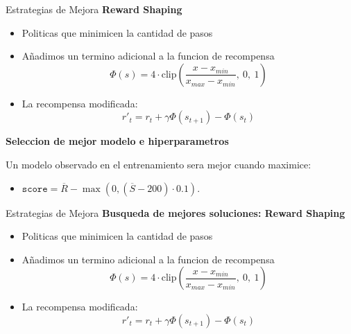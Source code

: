 \begin{frame}{Estrategias de Mejora}
    \textbf{Reward Shaping}
    \begin{itemize}
        \item Politicas que minimicen la cantidad de pasos
        \item Añadimos un termino adicional a la funcion de recompensa
        $$
            \Phi(s) = 4 \cdot \text{clip}\left( \frac{x - x_{min}}{x_{max} - x_{min}}, \ 0, \ 1 \right)
        $$
        \item La recompensa modificada:
        $$
            r'_t = r_t + \gamma\Phi(s_{t+1}) - \Phi(s_t)
        $$
    \end{itemize}
    \textbf{Seleccion de mejor modelo e hiperparametros}
    
    Un modelo observado en el entrenamiento sera mejor cuando maximice:
    \begin{itemize}
        \item $\texttt{score} = \overline{R} - \max(0,(\overline{S}-200)\cdot 0.1).$
    \end{itemize}
\end{frame}

\begin{frame}{Estrategias de Mejora}
    \textbf{Busqueda de mejores soluciones: Reward Shaping}
    \begin{itemize}
        \item Politicas que minimicen la cantidad de pasos
        \item Añadimos un termino adicional a la funcion de recompensa
        $$
            \Phi(s) = 4 \cdot \text{clip}\left( \frac{x - x_{min}}{x_{max} - x_{min}}, \ 0, \ 1 \right)
        $$
        \item La recompensa modificada:
        $$
            r'_t = r_t + \gamma\Phi(s_{t+1}) - \Phi(s_t)
        $$
    \end{itemize}
    
\end{frame}